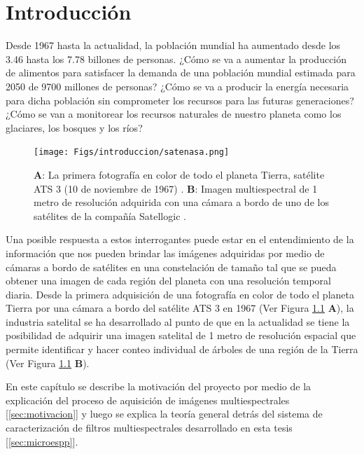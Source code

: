 \singlespacing
\chapter{Introducción}
\label{chap:introd}


\hspace{0.5cm}Desde 1967 hasta la actualidad, la población mundial ha aumentado desde los 3.46 hasta los 7.78 billones de personas. ¿Cómo se va a aumentar la producción de alimentos para satisfacer la demanda de una población mundial estimada para 2050 de 9700 millones de personas? ¿Cómo se va a producir la energía necesaria para dicha población sin comprometer los recursos para las futuras generaciones? ¿Cómo se van a monitorear los recursos naturales de nuestro planeta como los glaciares, los bosques y los ríos?

\begin{figure}[H]
\centering
\texttt{[image: Figs/introduccion/satenasa.png]}
\caption{\textbf{A}: La primera fotografía en color de todo el planeta Tierra, satélite ATS 3 (10 de noviembre de 1967)  \cite{nattierrra}. \textbf{B}: Imagen multiespectral de 1 metro de resolución adquirida con una cámara a bordo de uno de los satélites de la compañía Satellogic \cite{imsatt}.}
\label{figs:tierraysatell}
\end{figure}

Una posible respuesta a estos interrogantes puede estar en el entendimiento de la información que nos pueden brindar las imágenes adquiridas por medio de cámaras a bordo de satélites en una constelación de tamaño tal que se pueda obtener una imagen de cada región del planeta con una resolución temporal diaria. Desde la primera adquisición de una fotografía en color de todo el planeta Tierra por una cámara a bordo del satélite ATS 3 en 1967 (Ver Figura \ref{figs:tierraysatell} \textbf{A}), la industria satelital se ha desarrollado al punto de que en la actualidad se tiene la posibilidad de adquirir una imagen satelital de 1 metro de resolución espacial que permite identificar y hacer conteo individual de árboles de una región de la Tierra (Ver Figura \ref{figs:tierraysatell} \textbf{B}).

En este capítulo se describe la motivación del proyecto por medio de la explicación del proceso de aquisición de imágenes multiespectrales [\ref{sec:motivacion}] y luego se explica la teoría general detrás del sistema de caracterización de filtros multiespectrales desarrollado en esta tesis [\ref{sec:microespp}].

